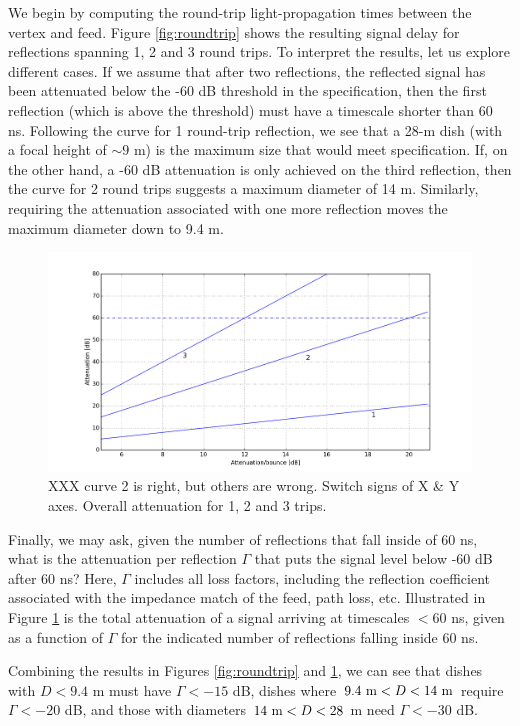 \documentclass[11pt]{article}
\begin{document}
We begin by computing the round-trip light-propagation times between the vertex and feed.  Figure
\ref{fig:roundtrip} shows the resulting signal delay for reflections spanning 1, 2 and
3 round trips.  To interpret the results, let us explore different cases.
If we assume that after two reflections, the reflected signal has been attenuated
below the -60 dB threshold in the specification, then the first reflection (which is above the
threshold) must have a timescale shorter than 60 ns.  Following the curve for 1 round-trip
reflection, we see that a 28-m dish (with a focal height of $\sim9$ m) is the maximum size
that would meet specification.  If, on the other hand, a -60 dB attenuation is only achieved on the
third reflection, then the curve for 2 round trips suggests a maximum diameter of 14 m.  Similarly,
requiring the attenuation associated with one more reflection moves the maximum diameter down
to 9.4 m.

\begin{figure}[h]
\centering
\includegraphics[width=1.0\textwidth]{bounces.png}
\caption{XXX curve 2 is right, but others are wrong.  Switch signs of X & Y axes.
Overall attenuation for 1, 2 and 3 trips.
} \label{fig:bounces}
\end{figure}

Finally, we may ask, given the number of reflections that fall inside of 60 ns,
what is the attenuation per reflection $\Gamma$ that puts the signal level below
-60 dB after 60 ns?  Here, $\Gamma$ includes all loss factors, including the 
reflection coefficient associated with the impedance match of the feed,
path loss, etc.  Illustrated in Figure \ref{fig:bounces} is the total attenuation 
of a signal arriving at timescales $<$60 ns,
given as a function of $\Gamma$ for the indicated number of reflections falling
inside 60 ns.

Combining the results in Figures \ref{fig:roundtrip} and \ref{fig:bounces},
we can see that dishes with $D<9.4$ m must have $\Gamma<-15$ dB, dishes
where $9.4~{\rm m}<D<14~{\rm m}$ require $\Gamma<-20$ dB, and those with
diameters $14~{\rm m}<D<28$ m need $\Gamma<-30$ dB.
\end{document}
